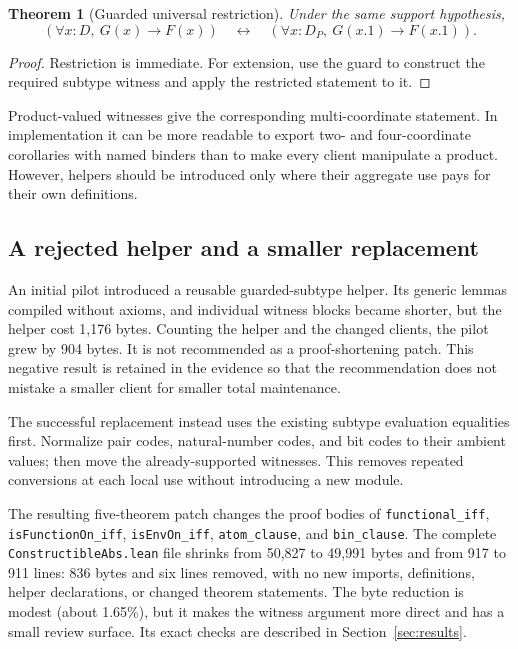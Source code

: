 \documentclass[11pt]{article}
\newtheorem{theorem}{Theorem}[section]
\theoremstyle{remark}\newtheorem{remark}[theorem]{Remark}
\newcommand{\code}[1]{\texttt{\small #1}}
\begin{document}
\begin{theorem}[Guarded universal restriction]
Under the same support hypothesis,
\[
 (\forall x:D,\ G(x)\to F(x))
 \quad\longleftrightarrow\quad
 (\forall x:D_P,\ G(x.1)\to F(x.1)).
\]
\end{theorem}
\begin{proof}
Restriction is immediate. For extension, use the guard to construct the required subtype witness and apply the restricted statement to it.
\end{proof}

Product-valued witnesses give the corresponding multi-coordinate statement. In implementation it can be more readable to export two- and four-coordinate corollaries with named binders than to make every client manipulate a product. However, helpers should be introduced only where their aggregate use pays for their own definitions.

\subsection{A rejected helper and a smaller replacement}
An initial pilot introduced a reusable guarded-subtype helper. Its generic lemmas compiled without axioms, and individual witness blocks became shorter, but the helper cost 1,176 bytes. Counting the helper and the changed clients, the pilot grew by 904 bytes. It is not recommended as a proof-shortening patch. This negative result is retained in the evidence so that the recommendation does not mistake a smaller client for smaller total maintenance.

The successful replacement instead uses the existing subtype evaluation equalities first. Normalize pair codes, natural-number codes, and bit codes to their ambient values; then move the already-supported witnesses. This removes repeated conversions at each local use without introducing a new module.

The resulting five-theorem patch changes the proof bodies of \code{functional\_iff}, \code{isFunctionOn\_iff}, \code{isEnvOn\_iff}, \code{atom\_clause}, and \code{bin\_clause}. The complete \code{ConstructibleAbs.lean} file shrinks from 50,827 to 49,991 bytes and from 917 to 911 lines: 836 bytes and six lines removed, with no new imports, definitions, helper declarations, or changed theorem statements. The byte reduction is modest (about 1.65\%), but it makes the witness argument more direct and has a small review surface. Its exact checks are described in Section~\ref{sec:results}.
\end{document}
